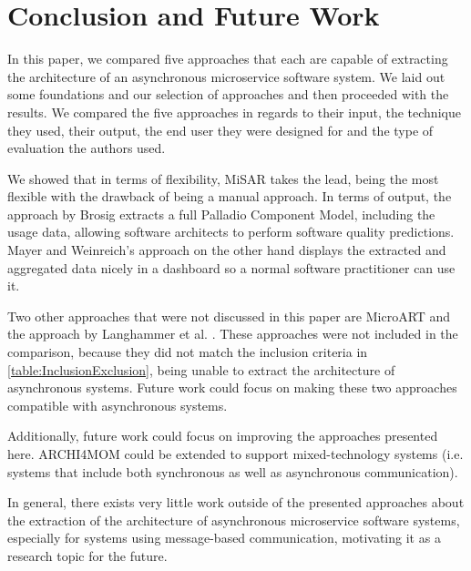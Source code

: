 
\section{Conclusion and Future Work}
\label{cha:Conclusion}
In this paper, we compared five approaches that each are capable of extracting the architecture of an asynchronous microservice software system.
We laid out some foundations and our selection of approaches and then proceeded with the results.
We compared the five approaches in regards to their input, the technique they used, their output, the end user they were designed for and the type of evaluation the authors used.

We showed that in terms of flexibility, MiSAR \cite{Alshuqayran2018MiSAR} takes the lead, being the most flexible with the drawback of being a manual approach.
In terms of output, the approach by Brosig \cite{Brosig2011} extracts a full Palladio Component Model, including the usage data, allowing software architects to perform software quality predictions.
Mayer and Weinreich's approach \cite{Mayer2018} on the other hand displays the extracted and aggregated data nicely in a dashboard so a normal software practitioner can use it.

Two other approaches that were not discussed in this paper are MicroART \cite{Granchelli2017MicroART} and the approach by Langhammer et al. \cite{Langhammer2016}.
These approaches were not included in the comparison, because they did not match the inclusion criteria in \autoref{table:InclusionExclusion}, being unable to extract the architecture of asynchronous systems.
Future work could focus on making these two approaches compatible with asynchronous systems.

Additionally, future work could focus on improving the approaches presented here.
ARCHI4MOM could be extended to support mixed-technology systems (i.e. systems that include both synchronous as well as asynchronous communication).

In general, there exists very little work outside of the presented approaches about the extraction of the architecture of asynchronous microservice software systems, especially for systems using message-based communication, motivating it as a research topic for the future. 